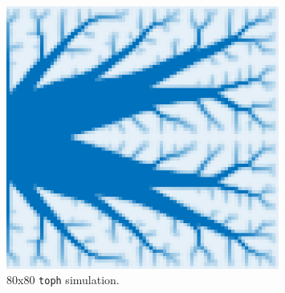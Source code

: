 \begin{figure}[H]
    \centering
    \caption{80x80 \texttt{toph} simulation.}
    \includegraphics[width=0.8\textwidth]{imgs/TopH/toph_2.png}
\end{figure}



